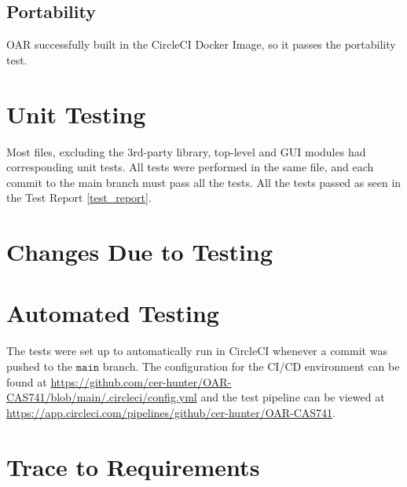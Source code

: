 \documentclass[12pt, titlepage]{article}
\begin{document}
\subsection{Portability}

OAR successfully built in the CircleCI Docker Image, so it passes the portability test.

\section{Unit Testing}

Most files, excluding the 3rd-party library, top-level and GUI modules had corresponding unit tests.
All tests were performed in the same file, and each commit to the main branch must pass all the tests.
All the tests passed as seen in the Test Report \ref{test_report}.

\section{Changes Due to Testing}


\section{Automated Testing}

The tests were set up to automatically run in CircleCI whenever a commit was pushed to the $\mathtt{main}$ branch.
The configuration for the CI/CD environment can be found at \url{https://github.com/cer-hunter/OAR-CAS741/blob/main/.circleci/config.yml}
and the test pipeline can be viewed at \url{https://app.circleci.com/pipelines/github/cer-hunter/OAR-CAS741}.
		
\section{Trace to Requirements}
\end{document}
